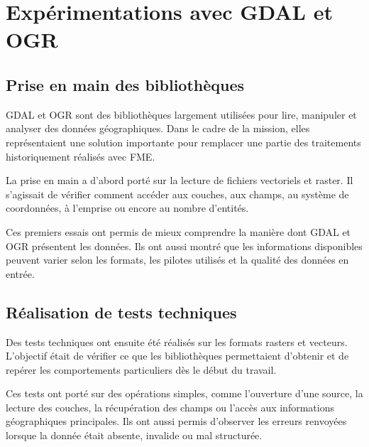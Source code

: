 \section{Expérimentations avec GDAL et OGR}
\label{sec:experimentations_gdal_ogr}


\subsection{Prise en main des bibliothèques}
\label{subsec:prise_en_main_gdal_ogr}

GDAL et OGR sont des bibliothèques largement utilisées pour lire, manipuler et
analyser des données géographiques. Dans le cadre de la mission, elles
représentaient une solution importante pour remplacer une partie des traitements
historiquement réalisés avec FME.

La prise en main a d'abord porté sur la lecture de fichiers vectoriels et
raster. Il s'agissait de vérifier comment accéder aux couches, aux champs, au
système de coordonnées, à l'emprise ou encore au nombre d'entités.

Ces premiers essais ont permis de mieux comprendre la manière dont GDAL et OGR
présentent les données. Ils ont aussi montré que les informations disponibles
peuvent varier selon les formats, les pilotes utilisés et la qualité des données
en entrée.


\subsection{Réalisation de tests techniques}
\label{subsec:tests_techniques_gdal_ogr}

Des tests techniques ont ensuite été réalisés sur les formats rasters et vecteurs.
L'objectif était de vérifier ce que les bibliothèques permettaient d'obtenir et
de repérer les comportements particuliers dès le début du travail.

Ces tests ont porté sur des opérations simples, comme l'ouverture d'une source,
la lecture des couches, la récupération des champs ou l'accès aux informations
géographiques principales. Ils ont aussi permis d'observer les erreurs
renvoyées lorsque la donnée était absente, invalide ou mal structurée.

